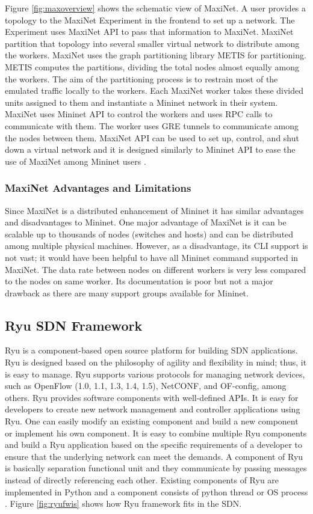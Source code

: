 Figure \ref{fig:maxoverview} shows the schematic view of MaxiNet. A user provides a topology to the MaxiNet Experiment in the frontend to set up a network. The Experiment uses MaxiNet API to pass that information to MaxiNet. MaxiNet partition that topology into several smaller virtual network to distribute among the workers. MaxiNet uses the graph partitioning library METIS \cite{Karypis95metis--} for partitioning. METIS computes the partitions, dividing the total nodes almost equally among the workers. The aim of the partitioning process is to restrain most of the emulated traffic locally to the workers. Each MaxiNet worker takes these divided units assigned to them and instantiate a Mininet network in their system. MaxiNet uses Mininet API to control the workers and uses RPC calls to communicate with them. The worker uses GRE tunnels to communicate among the nodes between them. MaxiNet API can be used to set up, control, and shut down a virtual network and it is designed similarly to Mininet API to ease the use of MaxiNet among Mininet users \cite{6857078}.
 
\subsubsection{MaxiNet Advantages and Limitations}
Since MaxiNet is a distributed enhancement of Mininet it has similar advantages and disadvantages to Mininet. One major advantage of MaxiNet is it can be scalable up to thousands of nodes (switches and hosts) and can be distributed among multiple physical machines. However, as a disadvantage, its CLI support is not vast; it would have been helpful to have all Mininet command supported in MaxiNet. The data rate between nodes on different workers is very less compared to the nodes on same worker. Its documentation is poor but not a major drawback as there are many support groups available for Mininet.

\subsection{Ryu SDN Framework}\label{sec:ryu}
Ryu is a component-based open source platform for building SDN applications. Ryu is designed based on the philosophy of agility and flexibility in mind; thus, it is easy to manage. Ryu supports various protocols for managing network devices, such as OpenFlow (1.0, 1.1, 1.3, 1.4, 1.5), NetCONF, and OF-config, among others. Ryu provides software components with well-defined APIs. It is easy for developers to create new network management and controller applications using Ryu. One can easily modify an existing component and build a new component or implement his own component. It is easy to combine multiple Ryu components and build a Ryu application based on the specific requirements of a developer to ensure that the underlying network can meet the demands. A component of Ryu is basically separation functional unit and they communicate by passing messages instead of directly referencing each other. Existing components of Ryu are implemented in Python and a component consists of python thread or OS process \cite{ryu}. Figure \ref{fig:ryufwis} shows how Ryu framework fits in the SDN.

